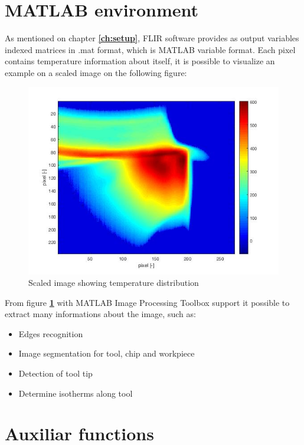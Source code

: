 \section{MATLAB environment}
	As mentioned on chapter \textbf{\ref{ch:setup}}, FLIR software provides as output variables indexed matrices in .mat format, which is MATLAB variable format. Each pixel contains temperature information about itself, it is possible to visualize an example on a scaled image on the following figure:

	\begin{figure}[H]
		\centering
		\captionsetup{justification=centering}
		\includegraphics[scale=0.75]{Cap4/TempDist.jpg}
		\caption{Scaled image showing temperature distribution}
		\label{fig:tempdist}
	\end{figure}

	From figure \textbf{\ref{fig:tempdist}} with MATLAB Image Processing Toolbox support it possible to extract many informations about the image, such as:

	\begin{itemize}
		\item Edges recognition
		\item Image segmentation for tool, chip and workpiece
		\item Detection of tool tip
		\item Determine isotherms along tool
	\end{itemize}
	
\section{Auxiliar functions}
